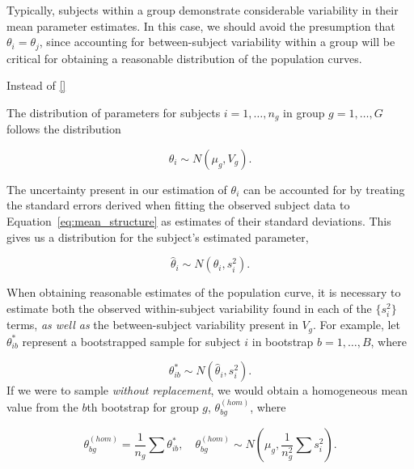 Typically, subjects within a group demonstrate considerable variability in their mean parameter estimates. In this case, we should avoid the presumption that $\theta_i = \theta_j$, since accounting for between-subject variability within a group will be critical for obtaining a reasonable distribution of the population curves.

Instead of \eqref{}

\label{eq:mean_structure}

The distribution of parameters for subjects $i = 1, \dots, n_g$ in group $g = 1, \dots, G$ follows the distribution

\begin{equation}\label{eq:theta_i_dist}
\theta_i \sim N(\mu_{g}, V_{g}).
\end{equation}

The uncertainty present in our estimation of $\theta_i$ can be accounted for by treating the standard errors derived when fitting the observed subject data to Equation~\ref{eq:mean_structure} as estimates of their standard deviations. This gives us a distribution for the subject's estimated parameter, 

\begin{equation}
\hat{\theta}_i \sim N(\theta_i, s_i^2).
\end{equation}

When obtaining reasonable estimates of the population curve, it is necessary to estimate both the observed within-subject variability found in each of the $\{s_i^2\}$ terms, \textit{as well as} the between-subject variability present in $V_{g}$. For example, let $\theta^*_{ib}$ represent a bootstrapped sample for subject $i$ in bootstrap $b = 1, \dots, B$, where

\begin{equation}\label{eq:sub_boot_dist}
\theta^*_{ib} \sim N(\hat{\theta}_i, s_i^2).
\end{equation}
If we were to sample \textit{without replacement}, we would obtain a homogeneous mean value from the $b$th bootstrap for group $g$, $\theta^{(hom)}_{bg}$, where

\begin{equation}\label{eq:wo_rep_boot}
\theta^{(hom)}_{bg} = \frac{1}{n_g} \sum \theta^{*}_{ib}, \quad \theta^{(hom)}_{bg} \sim N \left( \mu_{g}, \frac{1}{n_g^2} \sum s_i^2 \right).
\end{equation}

